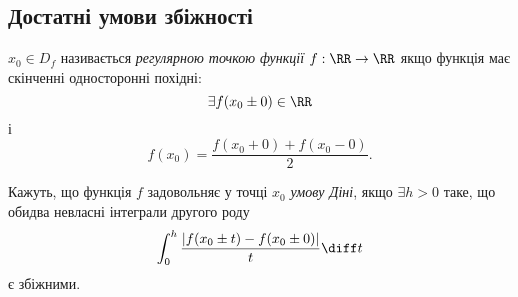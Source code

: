 \subsection{Достатні умови збіжності}

\begin{definition}
    $x_0 \in D_f$ називається \textit{регулярною точкою функції} $f: \RR \to \RR$ якщо функція має скінченні односторонні похідні:
    \begin{equation}
        \exists f (x_0 \pm 0) \in \RR
    \end{equation}
    і
    \begin{equation}
        f(x_0) = \frac{f(x_0 + 0) + f(x_0 - 0)}{2}.
    \end{equation}
\end{definition}

\begin{definition}
    Кажуть, що функція $f$ задовольняє у точці $x_0$ \textit{умову Діні}, якщо $\exists h > 0$ таке, що обидва невласні інтеграли другого роду
    \begin{equation}
        \int_0^h \frac{|f(x_0 \pm t) - f(x_0 \pm 0)|}{t} \diff t
    \end{equation}
    є збіжними.
\end{definition}

